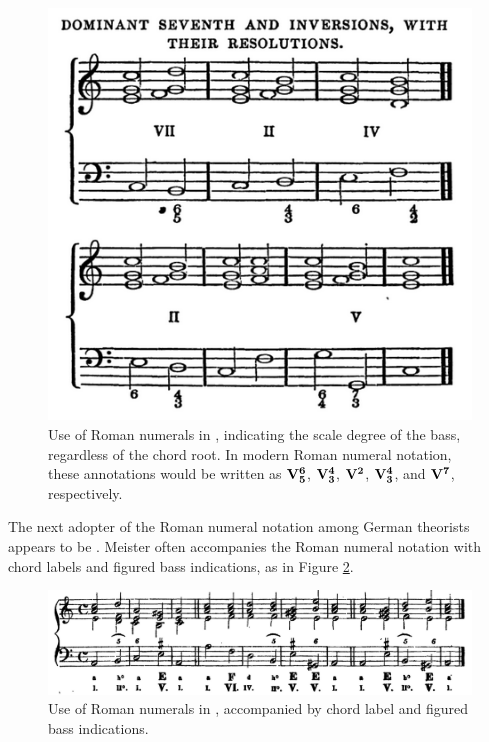 \begin{figure}[h!]
    \centering
    \includegraphics[width=\textwidth]{figures/chapter/2/primary_sources/hamilton1840cathecism044.png}
    \caption{Use of Roman numerals in \textcite{hamilton1840catechism}, indicating the scale degree of the bass, regardless of the chord root. In modern Roman numeral notation, these annotations would be written as $\textbf{V}\relax\relax{\footnotesize {}^\textbf{6}\relax_\textbf{5}\relax\relax}$, $\textbf{V}\relax\relax{\footnotesize {}^\textbf{4}\relax_\textbf{3}\relax\relax}$, $\textbf{V}\relax\relax{\footnotesize {}^\textbf{2}\relax\relax}$, $\textbf{V}\relax\relax{\footnotesize {}^\textbf{4}\relax_\textbf{3}\relax\relax}$, and $\textbf{V}\relax\relax{\footnotesize {}^\textbf{7}\relax\relax}$, respectively.}
    \label{fig:hamilton1840cathecism044}
\end{figure}

The next adopter of the Roman numeral notation among German theorists appears to be \textcite{meister1852vollstandige}.
Meister often accompanies the Roman numeral notation with chord labels and figured bass indications, as in Figure \ref{fig:meister1852vollstandige32}.

\begin{figure}
    \centering
    \includegraphics[width=\textwidth]{figures/chapter/2/primary_sources/meister1852vollstandige32.png}
    \caption{Use of Roman numerals in \textcite{meister1852vollstandige}, accompanied by chord label and figured bass indications.}
    \label{fig:meister1852vollstandige32}
\end{figure}

